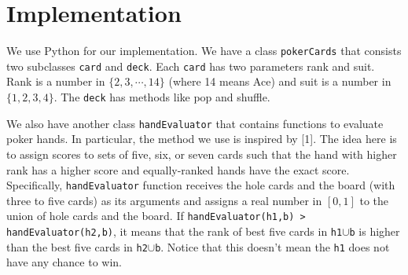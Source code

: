  
\section{Implementation}
We use Python for our implementation. We have a class {\tt pokerCards} that consists
two subclasses {\tt card} and {\tt deck}. Each {\tt card} has two parameters rank and suit.
Rank is a number in $\{2,3,\cdots,14\}$ (where 14 means Ace) and suit is a number in 
$\{1,2,3,4\}$. The {\tt deck} has methods like pop and shuffle.

We also have another class {\tt handEvaluator} that contains functions to evaluate poker hands.
In particular, the method we use is inspired by [1]. The idea here is to assign scores to sets of
five, six, or seven cards such that the hand with higher rank has a higher score and equally-ranked
hands have the exact score. Specifically, {\tt handEvaluator} function receives the hole cards and  
the board (with three to five cards) as its arguments and assigns a real number in $[0,1]$
to the union of hole cards and the board. If {\tt handEvaluator(h1,b) > handEvaluator(h2,b)},
it means that the rank of best five cards in {\tt h1$\cup$b} is higher than the best five cards
in {\tt h2$\cup$b}. Notice that this doesn't mean the {\tt h1} does not have any chance to win.
